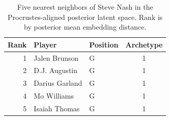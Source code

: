\begin{table}[htbp]
  \centering\small
  \begin{tabular}{rllc}
    \toprule
    Rank & Player & Position & Archetype \\
    \midrule
    1 & Jalen Brunson & G & 1 \\
    2 & D.J. Augustin & G & 1 \\
    3 & Darius Garland & G & 1 \\
    4 & Mo Williams & G & 1 \\
    5 & Isaiah Thomas & G & 1 \\
    \bottomrule
  \end{tabular}
  \caption{Five nearest neighbors of Steve Nash in the Procrustes-aligned posterior latent space. Rank is by posterior mean embedding distance.}
  \label{tab:Steve_Nash_neighbors}
\end{table}

